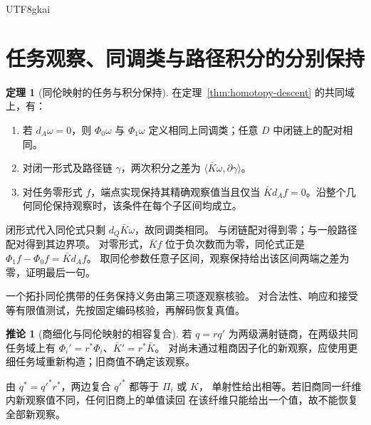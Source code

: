 \documentclass[12pt]{report}
\makeatletter
\theoremstyle{definition}
\newtheorem{theorem}{定理}[chapter]
\newtheorem{corollary}{推论}[chapter]
\renewenvironment{proof}[1][\proofname]{\par
  \pushQED{\qed}\normalfont
  \topsep6\p@\@plus6\p@\relax
  \trivlist
  \item[\hskip\labelsep\normalfont #1\@addpunct{.}]\ignorespaces
}{
  \popQED\endtrivlist\@endpefalse
}
\makeatother
\begin{document}
\begin{CJK*}{UTF8}{gkai}
\section{任务观察、同调类与路径积分的分别保持}
\begin{theorem}[同伦映射的任务与积分保持]
\label{thm:comparison-preservation}
在定理~\ref{thm:homotopy-descent} 的共同域上，有：
\begin{enumerate}
\item 若 \(d_A\omega=0\)，则 \(\Phi_0\omega\) 与 \(\Phi_1\omega\)
定义相同上同调类；任意 \(D\) 中闭链上的配对相同。
\item 对闭一形式及路径链 \(\gamma\)，两次积分之差为
\(\langle\bar K\omega,\partial\gamma\rangle\)。
\item 对任务零形式 \(f\)，端点实现保持其精确观察值当且仅当
\(\bar Kd_Af=0\)。沿整个几何同伦保持观察时，该条件在每个子区间均成立。
\end{enumerate}
\end{theorem}
\begin{proof}
闭形式代入同伦式只剩 \(d_Q\bar K\omega\)，故同调类相同。
与闭链配对得到零；与一般路径配对得到其边界项。
对零形式，\(\bar Kf\) 位于负次数而为零，同伦式正是
\(\Phi_1f-\Phi_0f=\bar Kd_Af\)。
取同伦参数任意子区间，观察保持给出该区间两端之差为零，证明最后一句。
\end{proof}
一个拓扑同伦携带的任务保持义务由第三项逐观察核验。
对合法性、响应和接受等有限值测试，先按固定编码核验，再解码恢复真值。
\begin{corollary}[商细化与同伦映射的相容复合]
\label{cor:comparison-refinement}
若 \(q=rq'\) 为两级满射链商，在两级共同任务域上有
\(\Phi_i'=r^*\Phi_i\)、\(\bar K'=r^*\bar K\)。
对尚未通过粗商因子化的新观察，应使用更细任务域重新构造；旧商值不确定该观察。
\end{corollary}
\begin{proof}
由 \(q^*=q'^*r^*\)，两边复合 \(q'^*\) 都等于 \(\Pi_i\) 或 \(K\)，
单射性给出相等。若旧商同一纤维内新观察值不同，任何旧商上的单值读回
在该纤维只能给出一个值，故不能恢复全部新观察。
\end{proof}


\end{CJK*}
\end{document}
